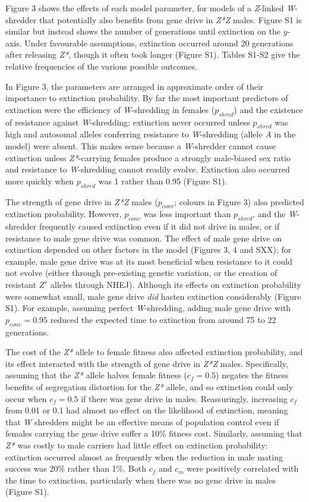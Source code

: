 \documentclass[]{rsos}%
\begin{document}
Figure 3 shows the effects of each model parameter, for models of a
\emph{Z}-linked \emph{W}-shredder that potentially also benefits from
gene drive in \emph{Z*Z} males. Figure S1 is similar but instead shows
the number of generations until extinction on the \(y\)-axis. Under
favourable assumptions, extinction occurred around 20 generations after
releasing \emph{Z*}, though it often took longer (Figure S1). Tables
S1-S2 give the relative frequencies of the various possible outcomes.

In Figure 3, the parameters are arranged in approximate order of their
importance to extinction probability. By far the most important
predictors of extinction were the efficiency of \emph{W}-shredding in
females (\(p_{shred}\)) and the existence of resistance against
\emph{W}-shredding: extinction never occurred unless \(p_{shred}\) was
high and autosomal alleles conferring resistance to \emph{W}-shredding
(allele \emph{A} in the model) were absent. This makes sense because a
\emph{W}-shredder cannot cause extinction unless \emph{Z*}-carrying
females produce a strongly male-biased sex ratio and resistance to
\emph{W}-shredding cannot readily evolve. Extinction also occurred more
quickly when \(p_{shred}\) was 1 rather than 0.95 (Figure S1).

The strength of gene drive in \emph{Z*Z} males (\(p_{conv}\); colours in
Figure 3) also predicted extinction probability. However, \(p_{conv}\)
was less important than \(p_{shred}\), and the \emph{W}-shredder
frequently caused extinction even if it did not drive in males, or if
resistance to male gene drive was common. The effect of male gene drive
on extinction depended on other factors in the model (Figures 3, 4 and
SXX); for example, male gene drive was at its most beneficial when
resistance to it could not evolve (either through pre-existing genetic
variation, or the creation of resistant \(Z^r\) alleles through NHEJ).
Although its effects on extinction probability were somewhat small, male
gene drive \emph{did} hasten extinction considerably (Figure S1). For
example, assuming perfect \emph{W}-shredding, adding male gene drive
with \(p_{conv} = 0.95\) reduced the expected time to extinction from
around 75 to 22 generations.

The cost of the \emph{Z*} allele to female fitness also affected
extinction probability, and its effect interacted with the strength of
gene drive in \emph{Z*Z} males. Specifically, assuming that the
\emph{Z*} allele halves female fitness (\(c_f = 0.5\)) negates the
fitness benefits of segregation distortion for the \emph{Z*} allele, and
so extinction could only occur when \(c_f = 0.5\) if there was gene
drive in males. Reassuringly, increasing \(c_f\) from 0.01 or 0.1 had
almost no effect on the likelihood of extinction, meaning that \emph{W}
shredders might be an effective means of population control even if
females carrying the gene drive suffer a 10\% fitness cost. Similarly,
assuming that \emph{Z*} was costly to male carriers had little effect on
extinction probability: extinction occurred almost as frequently when
the reduction in male mating success was 20\% rather than 1\%. Both
\(c_f\) and \(c_m\) were positively correlated with the time to
extinction, particularly when there was no gene drive in males (Figure
S1).
\end{document}

